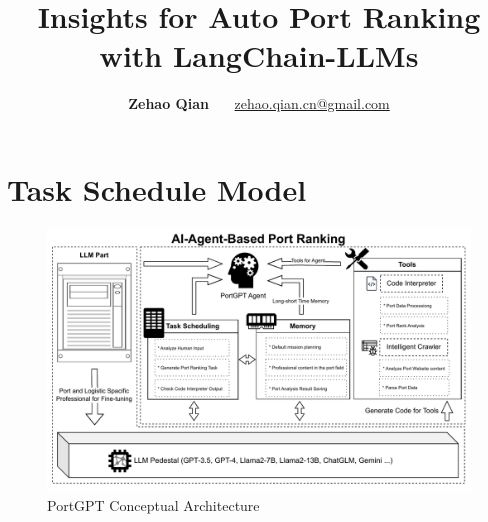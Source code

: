 \documentclass[11pt]{article} %
\title{Insights for Auto Port Ranking with LangChain-LLMs}
\author{\textbf{Zehao Qian} \ \ \ \href{mailto:zehao.qian.cn@gmail.com}{zehao.qian.cn@gmail.com}}
\begin{document}
\maketitle
% 
% 
% 
\tableofcontents
% 
% 
% 
% 
\section{Task Schedule Model}
% 
\begin{figure}[H]
    \centering
    \includegraphics[width=1.0\textwidth]{pic/PortGPT.pdf}
    \caption{PortGPT Conceptual Architecture}
    \label{fig:PortGPT}
\end{figure}
% 
\cite{9458712}
% 
% 
% 
% 


% 
% 
% 
% 
% 
% 
% 
% 
\end{document}

